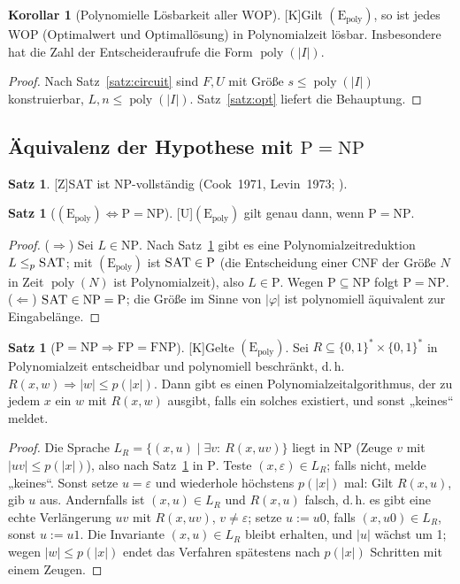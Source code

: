 \documentclass[a4paper,12pt]{article}
\theoremstyle{definition}
\newtheorem{satz}[definition]{Satz}
\newtheorem{korollar}[definition]{Korollar}
\newcommand{\tU}{\textsf{\small[U]}}   %
\newcommand{\tK}{\textsf{\small[K]}}   %
\newcommand{\tZ}{\textsf{\small[Z]}}   %
\newcommand{\bits}{\{0,1\}}
\newcommand{\cP}{\ensuremath{\mathrm{P}}}
\newcommand{\cNP}{\ensuremath{\mathrm{NP}}}
\newcommand{\cFP}{\ensuremath{\mathrm{FP}}}
\newcommand{\cFNP}{\ensuremath{\mathrm{FNP}}}
\newcommand{\SAT}{\textsc{SAT}}
\newcommand{\Epoly}{(\mathrm{E}_{\mathrm{poly}})}
\newcommand{\poly}{\operatorname{poly}}
\begin{document}
\begin{korollar}[Polynomielle Lösbarkeit aller WOP]\tK\label{kor:wop}
Gilt \(\Epoly\), so ist jedes WOP (Optimalwert und Optimallösung) in Polynomialzeit lösbar. Insbesondere hat die Zahl der Entscheideraufrufe die Form \(\poly(|I|)\).
\end{korollar}
\begin{proof}
Nach Satz~\ref{satz:circuit} sind \(F,U\) mit Größe \(s\le\poly(|I|)\) konstruierbar, \(L,n\le\poly(|I|)\). Satz~\ref{satz:opt} liefert die Behauptung.
\end{proof}

\subsection{Äquivalenz der Hypothese mit \texorpdfstring{\(\cP=\cNP\)}{P=NP}}

\begin{satz}\tZ\label{satz:cook}
\SAT{} ist \(\cNP\)-vollständig (Cook~1971, Levin~1973; \cite{cook,karp}).
\end{satz}

\begin{satz}[\texorpdfstring{\(\Epoly\Leftrightarrow\cP=\cNP\)}{E(poly) <=> P=NP}]\tU\label{satz:Epoly-PNP}
\(\Epoly\) gilt genau dann, wenn \(\cP=\cNP\).
\end{satz}
\begin{proof}
(\(\Rightarrow\)) Sei \(L\in\cNP\). Nach Satz~\ref{satz:cook} gibt es eine Polynomialzeitreduktion \(L\le_p\SAT\); mit \(\Epoly\) ist \(\SAT\in\cP\) (die Entscheidung einer CNF der Größe \(N\) in Zeit \(\poly(N)\) ist Polynomialzeit), also \(L\in\cP\). Wegen \(\cP\subseteq\cNP\) folgt \(\cP=\cNP\).
(\(\Leftarrow\)) \(\SAT\in\cNP=\cP\); die Größe im Sinne von \(|\varphi|\) ist polynomiell äquivalent zur Eingabelänge.
\end{proof}

\begin{satz}[\(\cP=\cNP\Rightarrow\cFP=\cFNP\)]\tK\label{satz:fpfnp}
Gelte \(\Epoly\). Sei \(R\subseteq\bits^*\times\bits^*\) in Polynomialzeit entscheidbar und polynomiell beschränkt, d.\,h. \(R(x,w)\Rightarrow|w|\le p(|x|)\). Dann gibt es einen Polynomialzeitalgorithmus, der zu jedem \(x\) ein \(w\) mit \(R(x,w)\) ausgibt, falls ein solches existiert, und sonst „keines“ meldet.
\end{satz}
\begin{proof}
Die Sprache \(L_R=\{(x,u)\mid\exists v:\ R(x,uv)\}\) liegt in \(\cNP\) (Zeuge \(v\) mit \(|uv|\le p(|x|)\)), also nach Satz~\ref{satz:Epoly-PNP} in \(\cP\). Teste \((x,\varepsilon)\in L_R\); falls nicht, melde „keines“. Sonst setze \(u=\varepsilon\) und wiederhole höchstens \(p(|x|)\) mal: Gilt \(R(x,u)\), gib \(u\) aus. Andernfalls ist \((x,u)\in L_R\) und \(R(x,u)\) falsch, d.\,h. es gibt eine echte Verlängerung \(uv\) mit \(R(x,uv)\), \(v\neq\varepsilon\); setze \(u:=u0\), falls \((x,u0)\in L_R\), sonst \(u:=u1\). Die Invariante \((x,u)\in L_R\) bleibt erhalten, und \(|u|\) wächst um 1; wegen \(|w|\le p(|x|)\) endet das Verfahren spätestens nach \(p(|x|)\) Schritten mit einem Zeugen.
\end{proof}
\end{document}
